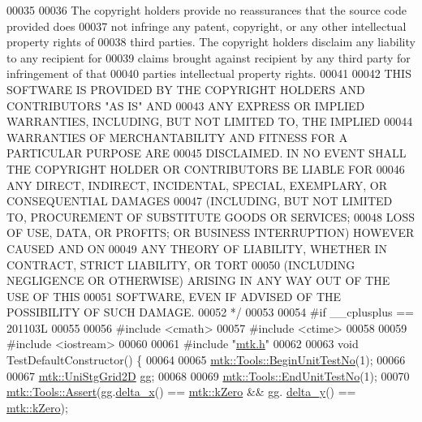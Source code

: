 \begin{DoxyCode}
00035 \textcolor{comment}{}
00036 \textcolor{comment}{The copyright holders provide no reassurances that the source code provided does}
00037 \textcolor{comment}{not infringe any patent, copyright, or any other intellectual property rights of}
00038 \textcolor{comment}{third parties. The copyright holders disclaim any liability to any recipient for}
00039 \textcolor{comment}{claims brought against recipient by any third party for infringement of that}
00040 \textcolor{comment}{parties intellectual property rights.}
00041 \textcolor{comment}{}
00042 \textcolor{comment}{THIS SOFTWARE IS PROVIDED BY THE COPYRIGHT HOLDERS AND CONTRIBUTORS "AS IS" AND}
00043 \textcolor{comment}{ANY EXPRESS OR IMPLIED WARRANTIES, INCLUDING, BUT NOT LIMITED TO, THE IMPLIED}
00044 \textcolor{comment}{WARRANTIES OF MERCHANTABILITY AND FITNESS FOR A PARTICULAR PURPOSE ARE}
00045 \textcolor{comment}{DISCLAIMED. IN NO EVENT SHALL THE COPYRIGHT HOLDER OR CONTRIBUTORS BE LIABLE FOR}
00046 \textcolor{comment}{ANY DIRECT, INDIRECT, INCIDENTAL, SPECIAL, EXEMPLARY, OR CONSEQUENTIAL DAMAGES}
00047 \textcolor{comment}{(INCLUDING, BUT NOT LIMITED TO, PROCUREMENT OF SUBSTITUTE GOODS OR SERVICES;}
00048 \textcolor{comment}{LOSS OF USE, DATA, OR PROFITS; OR BUSINESS INTERRUPTION) HOWEVER CAUSED AND ON}
00049 \textcolor{comment}{ANY THEORY OF LIABILITY, WHETHER IN CONTRACT, STRICT LIABILITY, OR TORT}
00050 \textcolor{comment}{(INCLUDING NEGLIGENCE OR OTHERWISE) ARISING IN ANY WAY OUT OF THE USE OF THIS}
00051 \textcolor{comment}{SOFTWARE, EVEN IF ADVISED OF THE POSSIBILITY OF SUCH DAMAGE.}
00052 \textcolor{comment}{*/}
00053 
00054 \textcolor{preprocessor}{#if \_\_cplusplus == 201103L}
00055 
00056 \textcolor{preprocessor}{#include <cmath>}
00057 \textcolor{preprocessor}{#include <ctime>}
00058 
00059 \textcolor{preprocessor}{#include <iostream>}
00060 
00061 \textcolor{preprocessor}{#include "\hyperlink{mtk_8h}{mtk.h}"}
00062 
00063 \textcolor{keywordtype}{void} TestDefaultConstructor() \{
00064 
00065   \hyperlink{classmtk_1_1Tools_afc29ecaf337a13ed2e817d3890a5a441}{mtk::Tools::BeginUnitTestNo}(1);
00066 
00067   \hyperlink{classmtk_1_1UniStgGrid2D}{mtk::UniStgGrid2D} gg;
00068 
00069   \hyperlink{classmtk_1_1Tools_aba67d9dc35c9c1c49430fcc9ea035e03}{mtk::Tools::EndUnitTestNo}(1);
00070   \hyperlink{classmtk_1_1Tools_ac6804df469c94ab6a796fb64f1e44a89}{mtk::Tools::Assert}(gg.\hyperlink{classmtk_1_1UniStgGrid2D_aca4710004c4a7da6a9e8fd6ab32a691f}{delta\_x}() == \hyperlink{group__c01-roots_ga59a451a5fae30d59649bcda274fea271}{mtk::kZero} && gg.
      \hyperlink{classmtk_1_1UniStgGrid2D_a65a78cfc80ffdbeb282ed57af4dc5cb4}{delta\_y}() == \hyperlink{group__c01-roots_ga59a451a5fae30d59649bcda274fea271}{mtk::kZero});

\end{DoxyCode}
